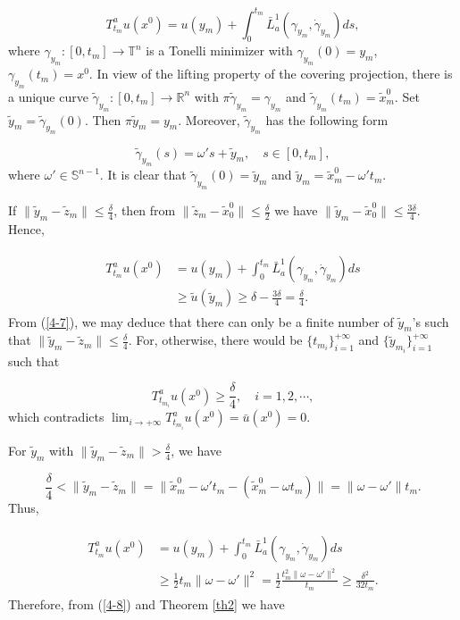 \documentclass{amsart}[12pt]
\theoremstyle{definition}
\theoremstyle{remark}
\numberwithin{equation}{section}
\begin{document}
\[
T^a_{t_m}u(x^0)=u(y_m)+\int_0^{t_m}\bar{L}^1_a(\gamma_{y_m},\dot{\gamma}_{y_m})ds,
\]
where $\gamma_{y_m}:[0,t_m]\to\mathbb{T}^n$ is a Tonelli minimizer
with $\gamma_{y_m}(0)=y_m$, $\gamma_{y_m}(t_m)=x^0$. In view of
the lifting property of the covering projection, there is a unique
curve $\tilde{\gamma}_{y_m}:[0,t_m]\to\mathbb{R}^n$ with
$\pi\tilde{\gamma}_{y_m}=\gamma_{y_m}$ and
$\tilde{\gamma}_{y_m}(t_m)=\tilde{x}^0_m$. Set
$\tilde{y}_m=\tilde{\gamma}_{y_m}(0)$. Then $\pi\tilde{y}_m=y_m$.
Moreover, $\tilde{\gamma}_{y_m}$ has the following form

\[
\tilde{\gamma}_{y_m}(s)=\omega's+\tilde{y}_m, \quad s\in[0,t_m],
\]
where $\omega'\in\mathbb{S}^{n-1}$. It is clear that
$\tilde{\gamma}_{y_m}(0)=\tilde{y}_m$ and
$\tilde{y}_m=\tilde{x}^0_m-\omega't_m$.

If $\|\tilde{y}_m-\tilde{z}_m\|\leq\frac{\delta}{4}$, then from
$\|\tilde{z}_m-\tilde{x}^0_0\|\leq\frac{\delta}{2}$ we have
$\|\tilde{y}_m-\tilde{x}^0_0\|\leq\frac{3\delta}{4}$. Hence,

\begin{align}\label{4-7}
\begin{split}
T^a_{t_m}u(x^0)&=u(y_m)+\int_0^{t_m}\bar{L}^1_a(\gamma_{y_m},\dot{\gamma}_{y_m})ds\\
               &\geq\tilde{u}(\tilde{y}_m)\geq\delta-\frac{3\delta}{4}=\frac{\delta}{4}.
\end{split}
\end{align}
From (\ref{4-7}), we may deduce that there can only be a  finite
number of  $\tilde{y}_m$'s such that
$\|\tilde{y}_m-\tilde{z}_m\|\leq\frac{\delta}{4}$. For, otherwise,
there would be $\{t_{m_i}\}_{i=1}^{+\infty}$ and
$\{\tilde{y}_{m_i}\}_{i=1}^{+\infty}$ such that

\[
T^a_{t_{m_i}}u(x^0)\geq\frac{\delta}{4}, \quad i=1,2,\cdots,
\]
which contradicts
$\lim_{i\to+\infty}T^a_{t_{m_i}}u(x^0)=\bar{u}(x^0)=0$.

For $\tilde{y}_m$ with
$\|\tilde{y}_m-\tilde{z}_m\|>\frac{\delta}{4}$, we have

\[
\frac{\delta}{4}<\|\tilde{y}_m-\tilde{z}_m\|=\|\tilde{x}_m^0-\omega't_m-(\tilde{x}_m^0-\omega
t_m)\|=\|\omega-\omega'\|t_m.
\]
Thus,

\begin{align}\label{4-8}
\begin{split}
T^a_{t_m}u(x^0)&=u(y_m)+\int_0^{t_m}\bar{L}^1_a(\gamma_{y_m},\dot{\gamma}_{y_m})ds\\
               &\geq\frac{1}{2}t_m\|\omega-\omega'\|^2=\frac{1}{2}\frac{t^2_m\|\omega-\omega'\|^2}{t_m}\geq\frac{\delta^2}{32t_m}.
\end{split}
\end{align}
Therefore, from (\ref{4-8}) and Theorem \ref{th2} we have
\end{document}
